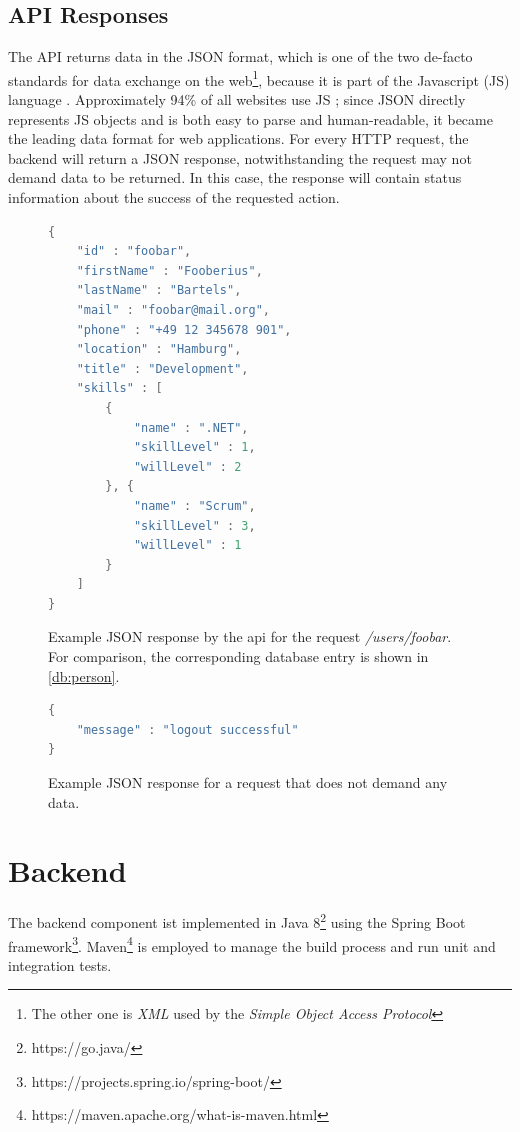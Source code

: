 \subsection{API Responses}
The API returns data in the JSON format, which is one of the two de-facto standards for data exchange on the web\footnote{The other one is \textit{XML} used by the \textit{Simple Object Access Protocol}}, because it is part of the Javascript (JS) language \cite[p. 37]{json}. Approximately 94\% of all websites use JS \cite{jsmarket}; since JSON directly represents JS objects and is both easy to parse and human-readable, it became the leading data format for web applications.
For every HTTP request, the backend will return a JSON response, notwithstanding the request may not demand data to be returned. In this case, the response will contain status information about the success of the requested action.

\begin{figure}
\begin{lstlisting}[language=Java]
{
	"id" : "foobar",
	"firstName" : "Fooberius",
	"lastName" : "Bartels",
	"mail" : "foobar@mail.org",
	"phone" : "+49 12 345678 901",
	"location" : "Hamburg",
	"title" : "Development",
	"skills" : [
		{
			"name" : ".NET",
			"skillLevel" : 1,
			"willLevel" : 2
		}, {
			"name" : "Scrum",
			"skillLevel" : 3,
			"willLevel" : 1
		}
	]
}
\end{lstlisting}
\caption[Person API Response]{Example JSON response by the api for the request \textit{/users/foobar}. For comparison, the corresponding database entry is shown in \ref{db:person}.}
\end{figure}


\begin{figure}
\begin{lstlisting}[language=Java]
{
	"message" : "logout successful"
}
\end{lstlisting}
\caption[Status API Response]{Example JSON response for a request that does not demand any data.}
\end{figure}


\section{Backend}
\label{impl:be}
The backend component ist implemented in Java 8\footnote{https://go.java/} using the Spring Boot framework\footnote{https://projects.spring.io/spring-boot/}. Maven\footnote{https://maven.apache.org/what-is-maven.html} is employed to manage the build process and run unit and integration tests.

